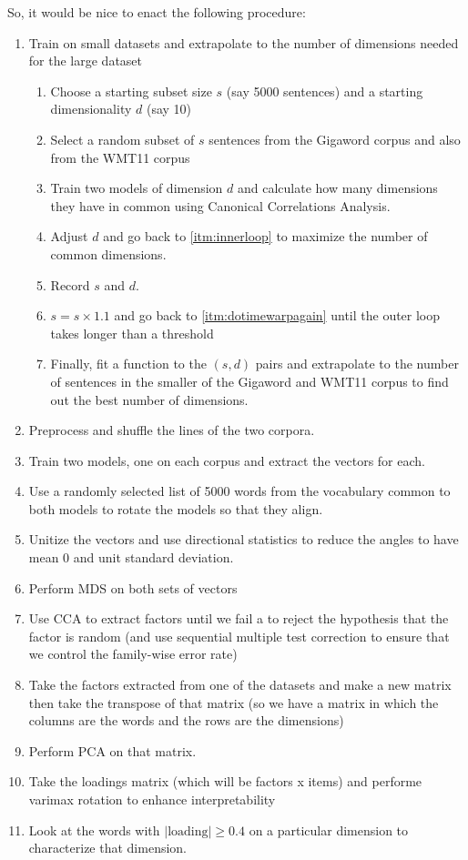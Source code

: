 \documentclass[eric_thesis.tex]{subfiles}
\begin{document}
So, it would be nice to enact the following procedure:
\begin{enumerate}
 \item Train on small datasets and extrapolate to the number of dimensions 
 needed for the large dataset
 \begin{enumerate}
    \item Choose a starting subset size $s$ (say 5000 sentences) and a starting
    dimensionality $d$ (say 10)
    \item \label{itm:dotimewarpagain} Select a random subset of $s$ sentences 
    from the Gigaword corpus and also from the WMT11 corpus
    \item \label{itm:innerloop} Train two models of dimension $d$ and calculate
    how many dimensions they have in common using Canonical Correlations Analysis.
    \item Adjust $d$ and go back to \ref{itm:innerloop} to maximize the number 
    of common dimensions.
    \item Record $s$ and $d$.
    \item $s = s\times 1.1$ and go back to \ref{itm:dotimewarpagain} until
    the outer loop takes longer than a threshold
    \item Finally, fit a function to the $(s,d)$ pairs and extrapolate to the 
    number of sentences in the smaller of the Gigaword and WMT11 corpus to find
    out the best number of dimensions.
 \end{enumerate}
 \item Preprocess and shuffle the lines of the two corpora.
 \item Train two models, one on each corpus and extract the vectors for each.
 \item Use a randomly selected list of 5000 words from the vocabulary common 
 to both models to rotate the models so that they align.
 \item Unitize the vectors and use directional statistics to reduce the angles
 to have mean 0 and unit standard deviation.
 \item Perform MDS on both sets of vectors
 \item Use CCA to extract factors until we fail a to reject the hypothesis that
 the factor is random (and use sequential multiple test correction to ensure
 that we control the family-wise error rate)
 \item Take the factors extracted from one of the datasets and make a new matrix
 then take the transpose of that matrix (so we have a matrix in which the 
 columns are the words and the rows are the \modelname{} dimensions)
 \item Perform PCA on that matrix. 
 \item Take the loadings matrix (which will be factors x items) and performe
 varimax rotation to enhance interpretability
 \item Look at the words with $|\text{loading}| \ge 0.4$ on a particular 
 dimension to characterize that dimension.
\end{enumerate}
\end{document}
